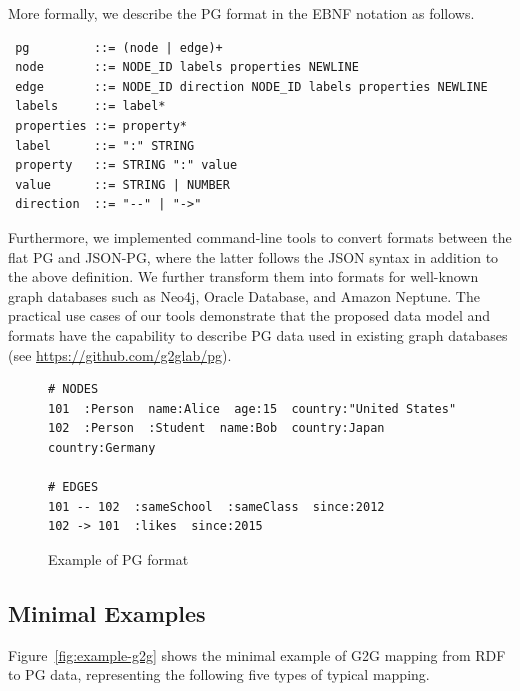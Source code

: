 \documentclass[runningheads]{llncs}
\begin{document}
More formally, we describe the PG format in the EBNF notation as follows.

\begin{defi}
\leavevmode
\begin{verbatim}
 pg         ::= (node | edge)+
 node       ::= NODE_ID labels properties NEWLINE
 edge       ::= NODE_ID direction NODE_ID labels properties NEWLINE
 labels     ::= label*
 properties ::= property*
 label      ::= ":" STRING
 property   ::= STRING ":" value
 value      ::= STRING | NUMBER
 direction  ::= "--" | "->"
\end{verbatim}
\end{defi}

Furthermore, we implemented command-line tools to convert formats between the flat PG and JSON-PG, where the latter follows the JSON syntax in addition to the above definition. We further transform them into formats for well-known graph databases such as Neo4j, Oracle Database, and Amazon Neptune. The practical use cases of our tools demonstrate that the proposed data model and formats have the capability to describe PG data used in existing graph databases (see \url{https://github.com/g2glab/pg}).

\begin{figure}[!t]
\begin{scriptsize}
\begin{verbatim}
# NODES
101  :Person  name:Alice  age:15  country:"United States"
102  :Person  :Student  name:Bob  country:Japan  country:Germany

# EDGES
101 -- 102  :sameSchool  :sameClass  since:2012
102 -> 101  :likes  since:2015
\end{verbatim}
\end{scriptsize}
\caption{Example of PG format}
\label{fig:example-pg}
\end{figure}


\subsection{Minimal Examples}
\label{subsec:minimal-examples}
Figure~\ref{fig:example-g2g} shows the minimal example of G2G mapping from RDF to PG data, representing the following five types of typical mapping.
\end{document}

